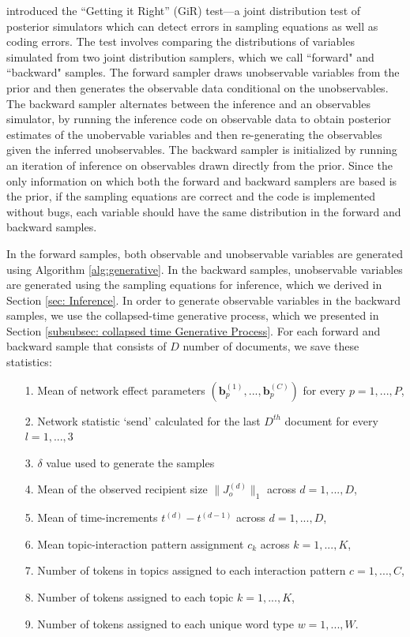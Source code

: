 \documentclass[a4paper]{article}
\begin{document}
   \cite{geweke2004getting} introduced the ``Getting it Right'' (GiR) test---a joint distribution test of posterior simulators which can detect errors in sampling equations as well as coding errors.  The test involves comparing the distributions of variables simulated from two joint distribution samplers, which we call ``forward" and ``backward" samples. The forward sampler draws unobservable variables from the prior and then generates the observable data conditional on the unobservables. The backward sampler alternates between the inference and an observables simulator, by running the inference code on observable data to obtain posterior estimates of the unobervable variables and then re-generating the observables given the inferred unobservables. The backward sampler is initialized by running an iteration of inference on observables drawn directly from the prior. Since the only information on which both the forward and backward samplers are based is the prior, if the sampling equations are correct and the code is implemented without bugs, each variable should have the same distribution in the forward and backward samples.
   
In the forward samples, both observable and unobservable variables are generated using Algorithm \ref{alg:generative}. In the backward samples, unobservable variables are generated using the sampling equations for inference, which we derived in Section \ref{sec: Inference}. In order to generate observable variables in the backward samples, we use the collapsed-time generative process, which we presented in Section \ref{subsubsec: collapsed time Generative Process}. For each forward and backward sample that consists of $D$ number of documents, we save these statistics:
      \begin{itemize}
      	\item[1.] Mean of network effect parameters $(\boldsymbol{b}_p^{(1)},...,\boldsymbol{b}_p^{(C)})$ for every $p = 1,...,P$,
      	      	\item[2.] Network statistic `send' calculated for the last $D^{th}$ document for every $l=1,...,3$
      	      	\item[3.] $\delta$ value used to generate the samples
      	      	\item[4.] Mean of the observed recipient size $ \lVert J_o^{(d)} \rVert_1 $ across $d=1,...,D$,
      	\item[5.] Mean of time-increments $t^{(d)}-t^{(d-1)}$ across $d=1,...,D$,
      	\item[6.] Mean topic-interaction pattern assignment $c_k$ across $k=1,...,K$, 
      	\item[7.] Number of tokens in topics assigned to each interaction pattern $c=1,...,C$,
      	\item[8.] Number of tokens assigned to each topic $k=1,...,K$, 
       \item[9.] Number of tokens assigned to each unique word type $w=1,...,W$.
      	      \end{itemize}
      	      
\end{document}
